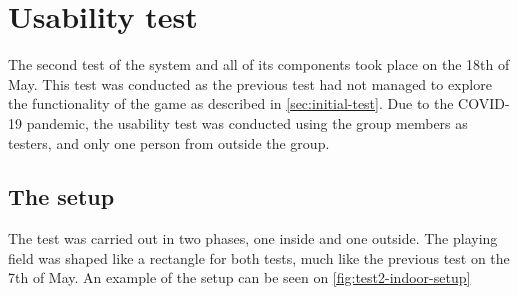 \section{Usability test}
The second test of the system and all of its components took place on the 18th of May.
This test was conducted as the previous test had not managed to explore the functionality of the game as described in \autoref{sec:initial-test}.
Due to the COVID-19 pandemic, the usability test was conducted using the group members as testers, and only one person from outside the group.

\subsection{The setup}
The test was carried out in two phases, one inside and one outside.
The playing field was shaped like a rectangle for both tests, much like the previous test on the 7th of May. An example of the setup can be seen on \autoref{fig:test2-indoor-setup}

